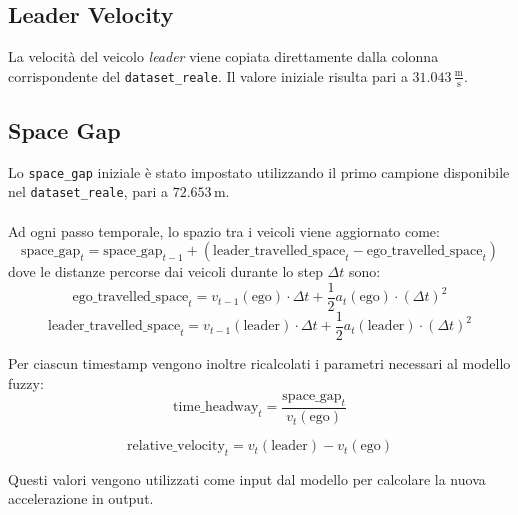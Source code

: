 \subsection{Leader Velocity}
La velocità del veicolo \emph{leader} viene copiata direttamente dalla colonna corrispondente del \texttt{dataset\_reale}.
Il valore iniziale risulta pari a $31.043 \, \frac{\mathrm{m}}{\mathrm{s}}$.

\subsection{Space Gap}
Lo \texttt{space\_gap} iniziale è stato impostato utilizzando il primo campione disponibile nel \texttt{dataset\_reale}, 
pari a $72.653 \, \mathrm{m}$.
\\\\
\noindent Ad ogni passo temporale, lo spazio tra i veicoli viene aggiornato come:
\[
\mathrm{space\_gap}_t = \mathrm{space\_gap}_{t-1} + \left( \mathrm{leader\_travelled\_space}_t - \mathrm{ego\_travelled\_space}_t \right)
\]
dove le distanze percorse dai veicoli durante lo step $\Delta t$ sono:
\[
\mathrm{ego\_travelled\_space}_t = v_{t-1}(\mathrm{ego}) \cdot \Delta t + \frac{1}{2} a_t(\mathrm{ego}) \cdot (\Delta t)^2
\]
\[
\mathrm{leader\_travelled\_space}_t = v_{t-1}(\mathrm{leader}) \cdot \Delta t + \frac{1}{2} a_t(\mathrm{leader}) \cdot (\Delta t)^2
\]

\vspace{10mm}
\noindent Per ciascun timestamp vengono inoltre ricalcolati i parametri necessari al modello fuzzy:  
\[
\mathrm{time\_headway}_t = \frac{\mathrm{space\_gap}_t}{v_t(\mathrm{ego})}
\]

\[
\mathrm{relative\_velocity}_t = v_t(\mathrm{leader}) - v_t(\mathrm{ego})
\]

\noindent Questi valori vengono utilizzati come input dal modello per calcolare la nuova accelerazione in output.




